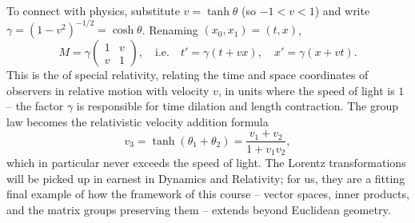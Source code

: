 To connect with physics, substitute $v = \tanh \theta$ (so $-1 < v < 1$) and write $\gamma = (1 - v^2)^{-1/2} = \cosh\theta$. Renaming $(x_0, x_1) = (t, x)$,
$$
M = \gamma\begin{pmatrix}
	1 & v \\ v & 1
\end{pmatrix},
\quad \text{i.e.} \quad
t' = \gamma(t + vx), \quad x' = \gamma(x + vt).
$$
This is the  of special relativity, relating the time and space coordinates of observers in relative motion with velocity $v$, in units where the speed of light is $1$ -- the factor $\gamma$ is responsible for time dilation and length contraction. The group law becomes the relativistic velocity addition formula
$$
v_3 = \tanh(\theta_1 + \theta_2) = \frac{v_1 + v_2}{1 + v_1v_2},
$$
which in particular never exceeds the speed of light. The Lorentz transformations will be picked up in earnest in Dynamics and Relativity; for us, they are a fitting final example of how the framework of this course -- vector spaces, inner products, and the matrix groups preserving them -- extends beyond Euclidean geometry.

